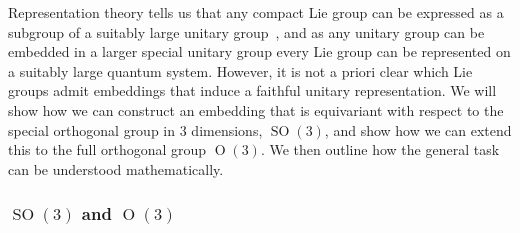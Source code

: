 \documentclass[a4paper,twocolumn,notitlepage,nofootinbib,superscriptaddress,floatfix]{revtex4-2}
\DeclareMathOperator{\SO}{\ensuremath{SO}}
\renewcommand{\O}{\ensuremath{\operatorname{O}}}
\begin{document}
Representation theory tells us that any compact Lie group can be expressed as a subgroup of a suitably large unitary group~\cite{folland2016course}, and as any unitary group can be embedded in a larger special unitary group every Lie group can be represented on a suitably large quantum system.  %
However, it is not a priori clear which Lie groups admit embeddings that induce a faithful unitary representation. 
We will show how we can construct an embedding that is equivariant with respect to the special orthogonal group in $3$ dimensions, $\SO(3)$, and show how we can extend this to the full orthogonal group $\O(3)$. We then outline how the general task can be understood mathematically.

\subsubsection*{$\SO(3)$ and $\O(3)$}
    
\end{document}
